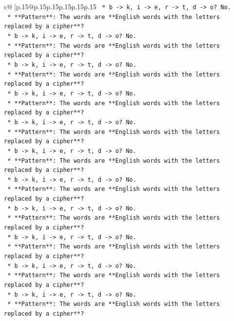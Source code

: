\documentclass{article}
\begin{document}
{\begin{supertabular}{c@{$\;$}|p{.15\linewidth}@{}p{.15\linewidth}p{.15\linewidth}p{.15\linewidth}p{.15\linewidth}p{.15\linewidth}}
{{{\texttt{    *   b {-}> k, i {-}> e, r {-}> t, d {-}> o? No.} \\
\texttt{    *   **Pattern**: The words are **English words with the letters replaced by a cipher**?} \\
\texttt{    *   b {-}> k, i {-}> e, r {-}> t, d {-}> o? No.} \\
\texttt{    *   **Pattern**: The words are **English words with the letters replaced by a cipher**?} \\
\texttt{    *   b {-}> k, i {-}> e, r {-}> t, d {-}> o? No.} \\
\texttt{    *   **Pattern**: The words are **English words with the letters replaced by a cipher**?} \\
\texttt{    *   b {-}> k, i {-}> e, r {-}> t, d {-}> o? No.} \\
\texttt{    *   **Pattern**: The words are **English words with the letters replaced by a cipher**?} \\
\texttt{    *   b {-}> k, i {-}> e, r {-}> t, d {-}> o? No.} \\
\texttt{    *   **Pattern**: The words are **English words with the letters replaced by a cipher**?} \\
\texttt{    *   b {-}> k, i {-}> e, r {-}> t, d {-}> o? No.} \\
\texttt{    *   **Pattern**: The words are **English words with the letters replaced by a cipher**?} \\
\texttt{    *   b {-}> k, i {-}> e, r {-}> t, d {-}> o? No.} \\
\texttt{    *   **Pattern**: The words are **English words with the letters replaced by a cipher**?} \\
\texttt{    *   b {-}> k, i {-}> e, r {-}> t, d {-}> o? No.} \\
\texttt{    *   **Pattern**: The words are **English words with the letters replaced by a cipher**?} \\
\texttt{    *   b {-}> k, i {-}> e, r {-}> t, d {-}> o? No.} \\
\texttt{    *   **Pattern**: The words are **English words with the letters replaced by a cipher**?} \\
\texttt{    *   b {-}> k, i {-}> e, r {-}> t, d {-}> o? No.} \\
\texttt{    *   **Pattern**: The words are **English words with the letters replaced by a cipher**?} \\
\texttt{    *   b {-}> k, i {-}> e, r {-}> t, d {-}> o? No.} \\
\texttt{    *   **Pattern**: The words are **English words with the letters replaced by a cipher**?} \\
}}}
\end{supertabular}}
\end{document}
